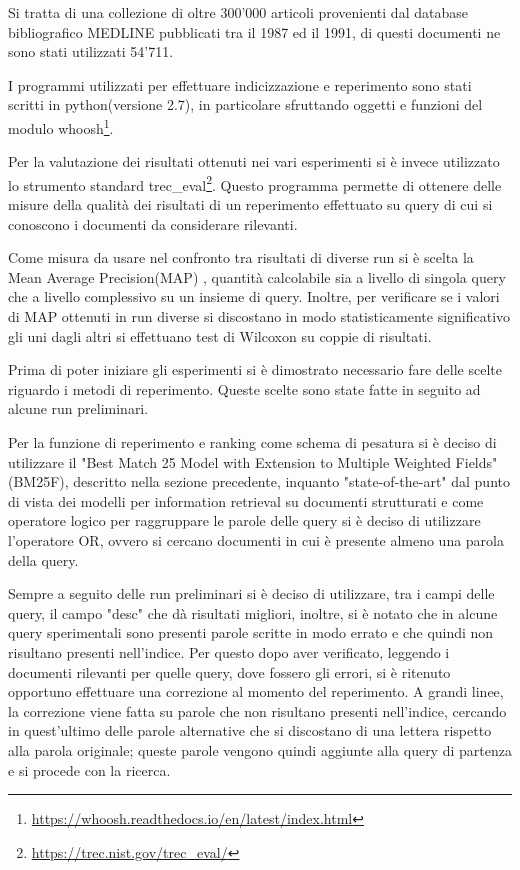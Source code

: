 \documentclass[runningheads]{llncs}
\begin{document}
Si tratta di una collezione di oltre 300'000 articoli provenienti dal database bibliografico MEDLINE pubblicati tra il 1987 ed il 1991, di questi documenti ne sono stati utilizzati 54'711.

I programmi utilizzati per effettuare indicizzazione e reperimento sono stati scritti in python(versione 2.7), in particolare sfruttando oggetti e funzioni del modulo whoosh\footnote{ \url{https://whoosh.readthedocs.io/en/latest/index.html}}.

Per la valutazione dei risultati ottenuti nei vari esperimenti si \`e invece utilizzato lo strumento standard trec\_eval\footnote{ \url{https://trec.nist.gov/trec\_eval/}}.
Questo programma permette di ottenere delle misure della qualit\`a dei risultati di un reperimento effettuato su query di cui si conoscono i documenti da considerare rilevanti.

Come misura da usare nel confronto tra risultati di diverse run si \`e scelta la Mean Average Precision(MAP)\cite{WBC_map} , quantit\`a calcolabile sia a livello di singola query che a livello complessivo su un insieme di query.
Inoltre, per verificare se i valori di MAP ottenuti in run diverse si discostano in modo statisticamente significativo gli uni dagli altri si effettuano test di Wilcoxon su coppie di risultati. \par







Prima di poter iniziare gli esperimenti si \`e dimostrato necessario fare delle scelte riguardo i metodi di reperimento.
Queste scelte sono state fatte in seguito ad alcune run preliminari.

Per la funzione di reperimento e ranking come schema di pesatura si \`e deciso di utilizzare il "Best Match 25 Model with Extension to Multiple Weighted Fields"(BM25F), descritto nella sezione precedente, inquanto "state-of-the-art" dal punto di vista dei modelli per information retrieval su documenti strutturati e come operatore logico per raggruppare le parole delle query si \`e deciso di utilizzare l'operatore OR, ovvero si cercano documenti in cui \`e presente almeno una parola della query.

Sempre a seguito delle run preliminari si \`e deciso di utilizzare, tra i campi delle query, il campo "desc" che d\`a risultati migliori, inoltre, si \`e notato che in alcune query sperimentali sono presenti parole scritte in modo errato e che quindi non risultano presenti nell'indice.
Per questo dopo aver verificato, leggendo i documenti rilevanti per quelle query, dove fossero gli errori, si \`e ritenuto opportuno effettuare una correzione al momento del reperimento.
A grandi linee, la correzione viene fatta su parole che non risultano presenti nell'indice, cercando in quest'ultimo delle parole alternative che si discostano di una lettera rispetto alla parola originale; queste parole vengono quindi aggiunte alla query di partenza e si procede con la ricerca.
\end{document}
